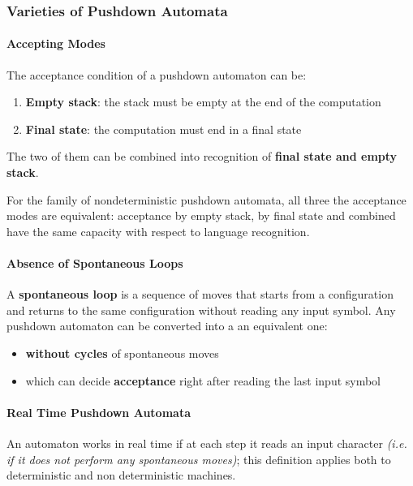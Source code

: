 \documentclass[english]{article}
\begin{document}
\subsubsection{Varieties of Pushdown Automata}

\paragraph{Accepting Modes}

The acceptance condition of a pushdown automaton can be:

\begin{enumerate}
  \item \textbf{Empty stack}: the stack must be empty at the end of the computation
  \item \textbf{Final state}: the computation must end in a final state
\end{enumerate}

The two of them can be combined into recognition of \textbf{final state and empty stack}.

For the family of nondeterministic pushdown automata, all three the acceptance modes are equivalent:
acceptance by empty stack, by final state and combined have the same capacity with respect to language recognition.

\paragraph{Absence of Spontaneous Loops}

A \textbf{spontaneous loop} is a sequence of moves that starts from a configuration and returns to the same configuration without reading any input symbol.
Any pushdown automaton can be converted into a an equivalent one:

\begin{itemize}
  \item \textbf{without cycles} of spontaneous moves
  \item which can decide \textbf{acceptance} right after reading the last input symbol
\end{itemize}

\paragraph{Real Time Pushdown Automata}

An automaton works in real time if at each step it reads an input character \textit{(i.e. if it does not perform any spontaneous moves)};
this definition applies both to deterministic and non deterministic machines.
\end{document}
